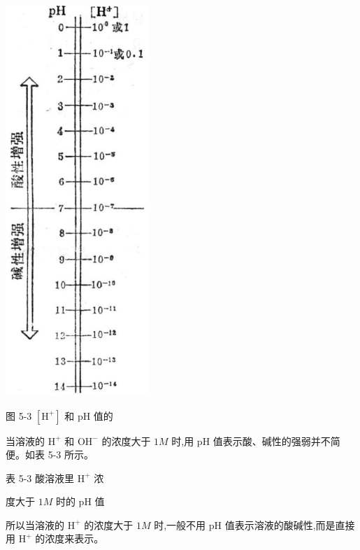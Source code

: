 \documentclass[10pt]{article}
\begin{document}
\begin{center}
\includegraphics[max width=0.4\textwidth]{images/01912d13-9986-7822-a012-3f3f7be99dcb_140_325019.jpg}
\end{center}

图 5-3 \(\left\lbrack {\mathrm{H}}^{ + }\right\rbrack\) 和 \(\mathrm{{pH}}\) 值的

当溶液的 \({\mathrm{H}}^{ + }\) 和 \({\mathrm{{OH}}}^{ - }\) 的浓度大于 \({1M}\) 时,用 \(\mathrm{{pH}}\) 值表示酸、碱性的强弱并不简便。如表 5-3 所示。

表 5-3 酸溶液里 \({\mathrm{H}}^{ + }\) 浓

度大于 \({1M}\) 时的 \(\mathrm{{pH}}\) 值

\begin{center}
\end{center}

所以当溶液的 \({\mathrm{H}}^{ + }\) 的浓度大于 \({1M}\) 时,一般不用 \(\mathrm{{pH}}\) 值表示溶液的酸碱性,而是直接用 \({\mathrm{H}}^{ + }\) 的浓度来表示。
\end{document}
